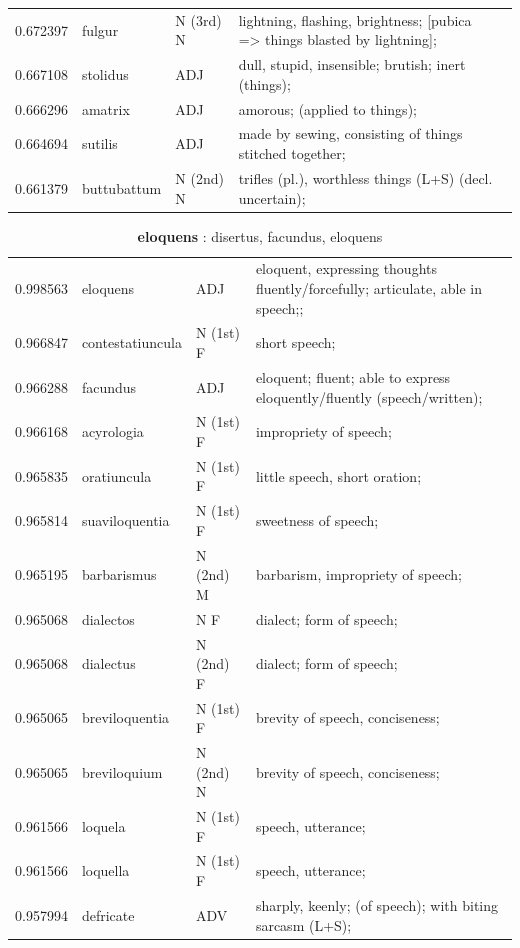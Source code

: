 \documentclass[]{article}
\begin{document}
\begin{table}
\begin{tabular}{l|lll}
	   0.672397 & fulgur & N (3rd) N & lightning, flashing, brightness; [pubica ~ => things blasted by lightning];\\
	   0.667108 & stolidus & ADJ & dull, stupid, insensible; brutish; inert (things);\\
	   0.666296 & amatrix & ADJ & amorous; (applied to things);\\
	   0.664694 & sutilis & ADJ & made by sewing, consisting of things stitched together;\\
	   0.661379 & buttubattum & N (2nd) N & trifles (pl.), worthless things (L+S) (decl. uncertain);\\
	\end{tabular}
	\end{table}


	\begin{table}
	\caption{\textbf{eloquens} : disertus, facundus, eloquens \label{eloquens}}
	\vspace{.25in}
	\begin{tabular}{l|lll}
	   0.998563 & eloquens & ADJ & eloquent, expressing thoughts fluently/forcefully; articulate, able in speech;;\\
	   0.966847 & contestatiuncula & N (1st) F & short speech;\\
	   0.966288 & facundus & ADJ & eloquent; fluent; able to express eloquently/fluently (speech/written);\\
	   0.966168 & acyrologia & N (1st) F & impropriety of speech;\\
	   0.965835 & oratiuncula & N (1st) F & little speech, short oration;\\
	   0.965814 & suaviloquentia & N (1st) F & sweetness of speech;\\
	   0.965195 & barbarismus & N (2nd) M & barbarism, impropriety of speech;\\
	   0.965068 & dialectos & N F & dialect; form of speech;\\
	   0.965068 & dialectus & N (2nd) F & dialect; form of speech;\\
	   0.965065 & breviloquentia & N (1st) F & brevity of speech, conciseness;\\
	   0.965065 & breviloquium & N (2nd) N & brevity of speech, conciseness;\\
	   0.961566 & loquela & N (1st) F & speech, utterance;\\
	   0.961566 & loquella & N (1st) F & speech, utterance;\\
	   0.957994 & defricate & ADV & sharply, keenly; (of speech); with biting sarcasm (L+S);\\

\end{tabular}
\end{table}
\end{document}
